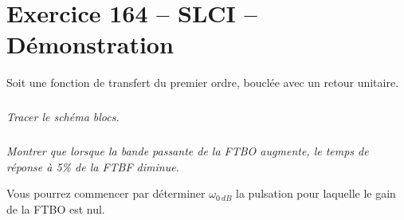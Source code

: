 \section*{Exercice 164 -- SLCI -- Démonstration}

\setcounter{exo}{0}

Soit une fonction de transfert du premier ordre, bouclée avec un retour unitaire.



\subparagraph{}\textit{Tracer le schéma blocs.}

\ifprof
\begin{corrige}
\end{corrige}
\else
\fi



\subparagraph{}\textit{Montrer que lorsque la bande passante de la FTBO augmente, le temps de réponse à 5\% de la FTBF diminue.}
\ifprof
\begin{corrige}
\end{corrige}
\else
\fi

Vous pourrez commencer par déterminer $\omega_{\SI{0}{dB}}$ la pulsation pour laquelle le gain de la FTBO est nul.
